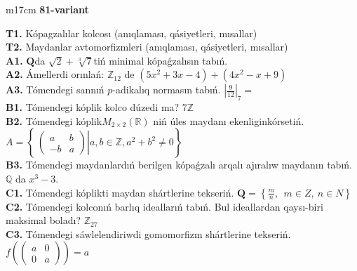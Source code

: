 \documentclass{article}
\begin{document}
\begin{tabular}{m{17cm}}
\textbf{81-variant}
\newline

\textbf{T1.} Kópagzalılar kolcosı (anıqlaması, qásiyetleri, mısallar) \\
\textbf{T2.} Maydanlar avtomorfizmleri (anıqlaması, qásiyetleri, mısallar) \\
\textbf{A1.} \(\mathbf{Q}\)da \(\sqrt{2} + \sqrt[3]{7}\)tiń minimal kópaǵzalısın tabıń. \\
\textbf{A2.} Ámellerdi orınlań: \(\mathbb{Z}_{12}\) de \(\left( 5x^{2} + 3x - 4 \right) + \left( 4x^{2} - x + 9 \right)\) \\
\textbf{A3.} Tómendegi sannıń \(p\)-adikalıq normasın tabıń. \(|\frac{9}{12}|_{7} =\) \\
\textbf{B1.} Tómendegi kóplik kolco dúzedi ma? \(7\mathbb{Z}\) \\
\textbf{B2.} Tómendegi kóplik\(M_{2 \times 2}\left( \mathbb{R} \right)\) niń úles maydanı ekenliginkórsetiń. \(A = \left\{ \left. \ \begin{pmatrix}
a & b \\
 - b & a
\end{pmatrix} \right|a,b\mathbb{\in Z},a^{2} + b^{2} \neq 0 \right\}\) \\
\textbf{B3.} Tómendegi maydanlardıń berilgen kópaǵzalı arqalı ajıralıw maydanın tabıń. \(\mathbb{Q}\) da \(x^{3} - 3\). \\
\textbf{C1.} Tómendegi kóplikti maydan shártlerine tekseriń. \(\mathbf{Q} = \left\{ \frac{m}{n},\ \ m \in Z,\ n \in N \right\}\) \\
\textbf{C2.} Tómendegi kolconıń barlıq ideallarıń tabıń. Bul ideallardan qaysı-biri maksimal boladı? \(\mathbb{Z}_{27}\) \\
\textbf{C3.} Tómendegi sáwlelendiriwdi gomomorfizm shártlerine tekseriń. \(f\left( \begin{pmatrix}
a & 0 \\
0 & a
\end{pmatrix} \right) = a\) \\

\end{tabular}
\vspace{1cm}
\end{document}
